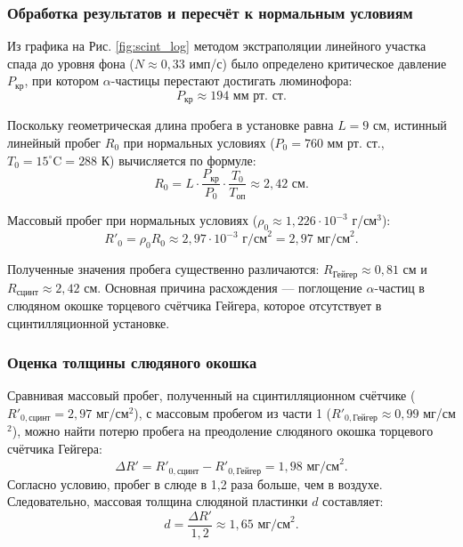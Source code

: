 \documentclass[12pt, a4paper]{article}
\begin{document}
\subsubsection*{Обработка результатов и пересчёт к нормальным условиям}
Из графика на Рис. \ref{fig:scint_log} методом экстраполяции линейного участка спада до уровня фона ($N \approx 0,33$ имп/с) было определено критическое давление $P_{\text{кр}}$, при котором $\alpha$-частицы перестают достигать люминофора:
\begin{equation}
    P_{\text{кр}} \approx 194 \text{ мм рт. ст.}
\end{equation}

Поскольку геометрическая длина пробега в установке равна $L = 9$ см, истинный линейный пробег $R_0$ при нормальных условиях ($P_0 = 760$ мм рт. ст., $T_0 = 15^\circ\text{C} = 288$ К) вычисляется по формуле:
\begin{equation}
    R_0 = L \cdot \frac{P_{\text{кр}}}{P_0} \cdot \frac{T_0}{T_{\text{оп}}} \approx 2,42 \text{ см}.
\end{equation}

Массовый пробег при нормальных условиях ($\rho_0 \approx 1,226 \cdot 10^{-3}$ г/см$^3$):
\begin{equation}
    R'_0 = \rho_0 R_0 \approx 2,97 \cdot 10^{-3} \text{ г/см}^2 = 2,97 \text{ мг/см}^2.
\end{equation}

Полученные значения пробега существенно различаются: $R_{\text{Гейгер}} \approx 0{,}81$ см и $R_{\text{сцинт}} \approx 2{,}42$ см. Основная причина расхождения — поглощение $\alpha$-частиц в слюдяном окошке торцевого счётчика Гейгера, которое отсутствует в сцинтилляционной установке.%


\subsubsection*{Оценка толщины слюдяного окошка }
Сравнивая массовый пробег, полученный на сцинтилляционном счётчике ($R'_{0, \text{сцинт}} = 2,97$ мг/см$^2$), с массовым пробегом из части 1 ($R'_{0, \text{Гейгер}} \approx 0,99$ мг/см$^2$), можно найти потерю пробега на преодоление слюдяного окошка торцевого счётчика Гейгера:
\begin{equation}
    \Delta R' = R'_{0, \text{сцинт}} - R'_{0, \text{Гейгер}} = 1,98 \text{ мг/см}^2.
\end{equation}
Согласно условию, пробег в слюде в 1,2 раза больше, чем в воздухе. Следовательно, массовая толщина слюдяной пластинки $d$ составляет:
\begin{equation}
    d = \frac{\Delta R'}{1,2} \approx 1,65 \text{ мг/см}^2.
\end{equation}
\end{document}
